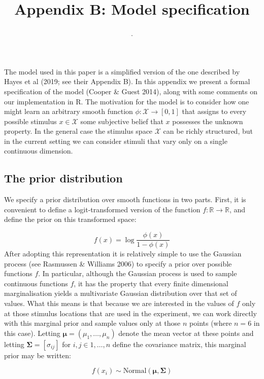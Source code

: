 \documentclass[
  english,
  doc]{apa6}
\author{.}
\affiliation{\phantom{a}}
\title{Appendix B: Model specification}
\date{}
\begin{document}
\maketitle

\noindent
The model used in this paper is a simplified version of the one described by Hayes et al (2019; see their Appendix B). In this appendix we present a formal specification of the model (Cooper \& Guest 2014), along with some comments on our implementation in R. The motivation for the model is to consider how one might learn an arbitrary smooth function \(\phi : \mathcal{X} \rightarrow [0, 1]\) that assigns to every possible stimulus \(x \in \mathcal{X}\) some subjective belief that \(x\) possesses the unknown property. In the general case the stimulus space \(\mathcal{X}\) can be richly structured, but in the current setting we can consider stimuli that vary only on a single continuous dimension.

\hypertarget{the-prior-distribution}{%
\subsection{The prior distribution}\label{the-prior-distribution}}

\noindent
We specify a prior distribution over smooth functions in two parts. First, it is convenient to define a logit-transformed version of the function \(f : \mathbb{R} \rightarrow \mathbb{R}\), and define the prior on this transformed space:

\[
f(x) = \log \frac{\phi(x)}{1 - \phi(x)}
\]
After adopting this representation it is relatively simple to use the Gaussian process (see Rasmussen \& Williams 2006) to specify a prior over possible functions \(f\). In particular, although the Gaussian process is used to sample continuous functions \(f\), it has the property that every finite dimensional marginalisation yields a multivariate Gaussian distribution over that set of values. What this means is that because we are interested in the values of \(f\) only at those stimulus locations that are used in the experiment, we can work directly with this marginal prior and sample values only at those \(n\) points (where \(n = 6\) in this case). Letting \(\bm{\mu} = (\mu_1, \ldots, \mu_n)\) denote the mean vector at these points and letting \(\bm{\Sigma} = [\sigma_{ij}]\) for \(i, j \in 1, \ldots, n\) define the covariance matrix, this marginal prior may be written:

\[
f(x_i) \sim \mbox{Normal}(\bm\mu, \bm\Sigma)
\]
\end{document}
